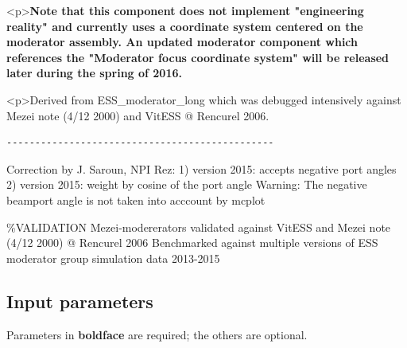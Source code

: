 \textless{}p\textgreater{}\textbf{Note that this component does not implement "engineering reality" and currently uses a coordinate system centered on the moderator assembly. An updated moderator component which references the "Moderator focus coordinate system" will be released later during the spring of 2016.}

\textless{}p\textgreater{}Derived from ESS\_moderator\_long which was debugged intensively against Mezei note (4/12 2000) and VitESS @ Rencurel 2006.

\begin{verbatim}
-----------------------------------------------
\end{verbatim}

Correction by J. Saroun, NPI Rez: 1) version 2015: accepts negative port angles 2) version 2015: weight by cosine of the port angle Warning: The negative beamport angle is not taken into acccount by mcplot

\%VALIDATION Mezei-modererators validated against VitESS and Mezei note (4/12 2000) @ Rencurel 2006 Benchmarked against multiple versions of ESS moderator group simulation data 2013-2015

\subsection*{Input parameters}
Parameters in \textbf{boldface} are required; the others are optional.

